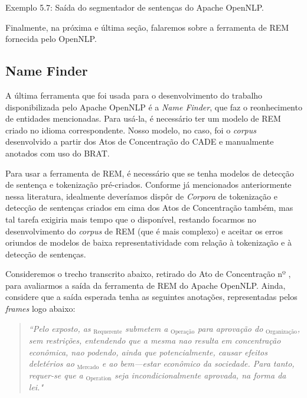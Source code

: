 \documentclass[11pt]{report}
\begin{document}
\begin{quote}
\end{quote}

\begin{center}
  Exemplo 5.7: Saída do segmentador de sentenças do Apache OpenNLP.
\end{center}

Finalmente, na próxima e última seção, falaremos sobre a ferramenta de REM fornecida pelo OpenNLP.

\pagebreak

\subsection{Name Finder}

\indent\indent A última ferramenta que foi usada para o desenvolvimento do trabalho disponibilizada pelo Apache OpenNLP é a \textit{Name Finder}, que faz o
reonhecimento de entidades mencionadas. Para usá-la, é necessário ter um modelo de REM criado no idioma correspondente. Nosso modelo, no caso, foi o \textit{corpus} desenvolvido
a partir dos Atos de Concentração do CADE e manualmente anotados com uso do BRAT.

Para usar a ferramenta de REM, é necessário que se tenha modelos de detecção de sentença e tokenização pré-criados. Conforme já mencionados anteriormente nessa literatura,
idealmente deveríamos dispôr de \textit{Corpora} de tokenização e detecção de sentenças criados em cima dos Atos de Concentração também, mas tal tarefa exigiria mais tempo que o
disponível, restando focarmos no desenvolvimento do \textit{corpus} de REM (que é mais complexo) e aceitar os erros oriundos de modelos de baixa representatividade com relação
à tokenização e à detecção de sentenças.

Consideremos o trecho transcrito abaixo, retirado do Ato de Concentração nº , para avaliarmos a saída da ferramenta de REM do Apache OpenNLP. Ainda, considere
que a saída esperada tenha as seguintes anotações, representadas pelos \textit{frames} logo abaixo:

\begin{quote}
  \textit{``Pelo exposto, as }$_{\text{Requerente}}$\textit{ submetem a }$_{\text{Operação}}$\textit{ para aprovação do }$_{\text{Organização}}$\textit{, sem restrições,
  entendendo que a mesma nao resulta em
  concentração econômica, nao podendo, ainda que potencialmente, causar efeitos deletérios ao }$_{\text{Mercado}}$\textit{ e ao bem—estar econômico da sociedade.
  Para tanto, requer-se que a }$_{\text{Operation}}$\textit{ seja incondicionalmente aprovada, na forma da lei."}
\end{quote}
\end{document}
